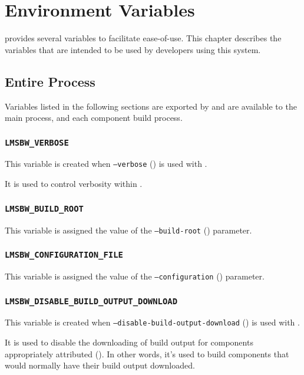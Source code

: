 \chapter{Environment Variables}

\lmsbw provides several variables to facilitate ease-of-use.  This
chapter describes the variables that are intended to be used by
developers using this system.

\section{Entire \lmsbw Process}

Variables listed in the following sections are exported by \lmsbwcmd
and are available to the main \lmsbw process, and each component build
process.

\subsection{\texttt{LMSBW\_VERBOSE}}

This variable is created when \texttt{--verbose}
() is used with \lmsbwcmd.

It is used to control verbosity within \lmsbw.

\subsection{\texttt{LMSBW\_BUILD\_ROOT}}

This variable is assigned the value of the \texttt{--build-root}
() parameter.

\subsection{\texttt{LMSBW\_CONFIGURATION\_FILE}}

This variable is assigned the value of the \texttt{--configuration}
() parameter.

\subsection{\texttt{LMSBW\_DISABLE\_BUILD\_OUTPUT\_DOWNLOAD}}

This variable is created when \texttt{--disable-build-output-download}
() is used with
\lmsbwcmd.

It is used to disable the downloading of build output for components
appropriately attributed ().  In
other words, it's used to build components that would normally have
their build output downloaded.

